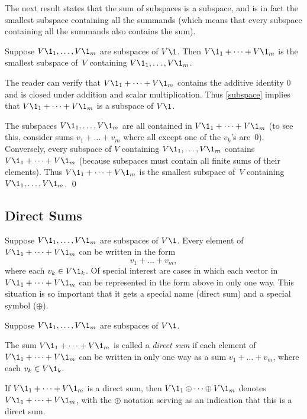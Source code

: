 The next result states that the sum of subspaces is a subspace, and is in fact the smallest subspace containing all the summands (which means that every subspace containing all the summands also contains the sum).

{Suppose $V\1_1, \dots, V\1_m$ are subspaces of $V\1$. Then $V\1_1 + \dots + V\1_m$ is the smallest subspace
of~$V$ containing $V\1_1, \dots, V\1_m$.}

\proof
The reader can verify that $V\1_1 + \dots + V\1_m$ contains the additive identity $0$ and is closed under addition and scalar multiplication. Thus \ref{subspace} implies that $V\1_1 + \dots + V\1_m$ is a subspace of $V\1$.


The subspaces $V\1_1, \dots, V\1_m$ are
all contained in $V\1_1 + \dots + V\1_m$ (to see this, consider sums
$v_1 + \dots + v_m$ where all except one of the $v_k$'s are~$0$).  Conversely, every
subspace of $V$ containing $V\1_1, \dots, V\1_m$ contains
$V\1_1 + \dots + V\1_m$ (because subspaces must contain all finite sums of their
elements). Thus $V\1_1 + \dots + V\1_m$ is the smallest subspace
of~$V$ containing $V\1_1, \dots, V\1_m$.
\qed

\subsection{Direct Sums}

Suppose $V\1_1, \dots, V\1_m$ are subspaces of $V\1$. Every element of $V\1_1 + \dots + V\1_m$ can be written in the
form
\[
v_1 + \dots + v_m,
\]
where each $v_k \in V\1_k$.  Of special interest are cases in which each
vector in $V\1_1 + \dots + V\1_m$ can be represented in the form above in only one way.  This situation is
so important that it gets a special name (direct sum) and a special symbol ($\oplus$).

{Suppose $V\1_1, \dots,  V\1_m$ are subspaces of $V\1$.
\begin{Itemize}
\item
The sum $V\1_1 + \dots + V\1_m$ is called a \emph{direct sum} if each element of~$V\1_1 + \dots + V\1_m$ can be written in only one way as a sum $v_1 + \dots + v_m$, where each $v_k \in V\1_k$.
\item
If $V\1_1 + \dots + V\1_m$ is a direct sum, then $V\1_1 \oplus \dots \oplus V\1_m$ denotes $V\1_1 + \dots + V\1_m$, with the $\oplus$ notation serving as an indication that this is a direct sum.
\end{Itemize}}

